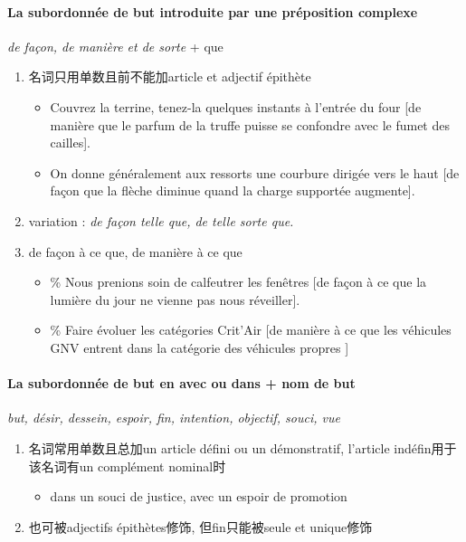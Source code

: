 \documentclass[UTF8]{report}
\begin{document}
\paragraph{La subordonnée de but introduite par une préposition complexe}
\textit{de façon, de manière et de sorte} + que 
\begin{enumerate}
    \item 名词只用单数且前不能加article et adjectif épithète
    \begin{itemize}
        \item Couvrez la terrine, tenez-la quelques instants à l’entrée du four [de manière que le parfum de la truffe puisse se confondre avec le fumet des cailles]. 
        \item On donne généralement aux ressorts une courbure dirigée vers le haut [de façon que la flèche diminue quand la charge supportée augmente].
    \end{itemize}
    \item variation : \textit{de façon telle que, de telle sorte que.}
    \item de façon à ce que, de manière à ce que
    \begin{itemize}
        \item \% Nous prenions soin de calfeutrer les fenêtres [de façon à ce que la lumière du jour ne vienne pas nous réveiller].
        \item \% Faire évoluer les catégories Crit’Air [de manière à ce que les véhicules GNV entrent dans la catégorie des véhicules propres ]
    \end{itemize}
\end{enumerate}

\paragraph{La subordonnée de but en avec ou dans + nom de but}
\textit{but, désir, dessein, espoir, fin, intention, objectif, souci, vue}
\begin{enumerate}
    \item 名词常用单数且总加un article défini ou un démonstratif, l’article indéfin用于该名词有un complément nominal时
    \begin{itemize}
        \item dans un souci de justice, avec un espoir de promotion
    \end{itemize}
    \item 也可被adjectifs épithètes修饰, 但fin只能被seule et unique修饰
\end{enumerate}
\end{document}
